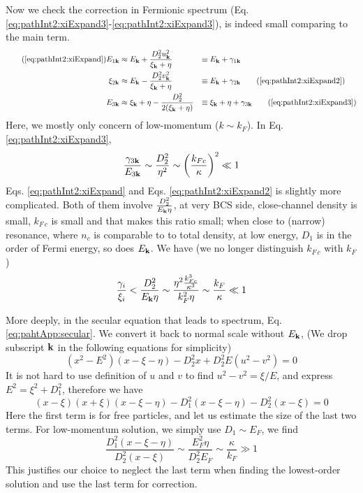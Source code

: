 Now we check the correction in Fermionic spectrum (Eq. \ref{eq:pathInt2:xiExpand3}-\ref{eq:pathInt2:xiExpand3}), 
is indeed small comparing to the main term.  
\begin{align}\tag{\ref{eq:pathInt2:xiExpand}}
E_{1\vk}&\approx{}E_{\vk}+\frac{D_{2}^{2}u_{\vk}^{2}}{\xi_{\vk}+\eta}&\equiv{}&E_{\vk}+\gamma_{1\vk}\\
\xi_{2\vk}&\approx{}E_{\vk}-\frac{D_{2}^{2}v_{\vk}^{2}}{\xi_{\vk}+\eta}&\equiv{}&E_{\vk}+\gamma_{2\vk}
\tag{\ref{eq:pathInt2:xiExpand2}}\\
E_{3\vk}&\approx{}\xi_{\vk}+\eta-\frac{D_{2}^{2}}{2(\xi_{\vk}+\eta)}&\equiv{}&\xi_{\vk}+\eta+\gamma_{3\vk}
\tag{\ref{eq:pathInt2:xiExpand3}}
\end{align}
Here, we mostly only concern of low-momentum ($k\sim{}k_{F}$).  In Eq. \ref{eq:pathInt2:xiExpand3}, 
\begin{equation*}
\frac{\gamma_{3\mathbf{k}}}{E_{3\mathbf{k}}}\sim{}\frac{D_{2}^{2}}{\eta^{2}}\sim\left(\frac{k_{Fc}}{\kappa}\right)^{2}\ll1
\end{equation*}
Eqs. \ref{eq:pathInt2:xiExpand} and Eqs. \ref{eq:pathInt2:xiExpand2} is slightly more complicated.  Both of them involve $\frac{D_{2}^{2}}{E_{\mathbf{k}}\eta}$,  at very BCS side, close-channel density is small, $k_{F\,c}$ is small and that makes this ratio small; when close to (narrow) resonance, where $n_{c}$ is comparable to to total density, at low energy, $D_{1}$ is in the order of Fermi energy, so does $E_{\mathbf{k}}$.   We have (we no longer distinguish $k_{F\,c}$ with $k_{F}$)
 \begin{equation*}
 \frac{\gamma_{i}}{\xi_{i}}<\frac{D_{2}^{2}}{E_{\mathbf{k}}\eta}\sim\frac{\eta^{2}\frac{k_{Fc}^{3}}{\kappa^{3}}}{k_{F}^{2}\eta}\sim\frac{k_{F}}{\kappa}\ll1
\end{equation*}

More deeply, in the secular equation that leads to spectrum, Eq. \ref{eq:pahtApp:secular}.  We convert it back to normal scale without $E_{\mathbf{k}}$,  (We drop subscript $\mathbf{k}$ in the following equations for simplicity)
\begin{equation*}
(x^{2}-E^{2})(x-\xi-\eta)-D_{2}^{2}x+D_{2}^{2}E(u^{2}-v^{2})=0
\end{equation*}
It is not hard to use definition of $u$ and $v$ to find $u^{2}-v^{2}=\xi/E$, and express $E^{2}=\xi^{2}+D_{1}^{2}$, therefore we have
\begin{equation*}
(x-\xi)(x+\xi)(x-\xi-\eta)-D_{1}^{2}(x-\xi-\eta)-D_{2}^{2}(x-\xi)=0
\end{equation*}
Here the first term is for free particles, and let us estimate the size of the last two terms.  For low-momentum solution, we simply use $D_{1}\sim{}E_{F}$, we find
\begin{equation*}
\frac{D_{1}^{2}(x-\xi-\eta)}{D_{2}^{2}(x-\xi)}\sim\frac{E_{F}^{2}\eta}{D_{2}^{2}E_{F}}\sim\frac{\kappa}{k_{F}}\gg1
\end{equation*}
This justifies our choice to neglect the last term when finding the lowest-order solution and use the last term for correction.  

